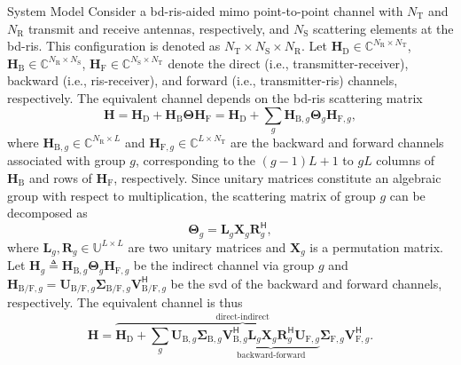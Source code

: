\documentclass[journal]{IEEEtran}
\begin{document}
\begin{section}{System Model}
		Consider a \gls{bd}-\gls{ris}-aided \gls{mimo} point-to-point channel with $N_\mathrm{T}$ and $N_\mathrm{R}$ transmit and receive antennas, respectively, and $N_\mathrm{S}$ scattering elements at the \gls{bd}-\gls{ris}.
		This configuration is denoted as $N_\mathrm{T} \times N_\mathrm{S} \times N_\mathrm{R}$.
		Let $\mathbf{H}_\mathrm{D} \in \mathbb{C}^{N_\mathrm{R} \times N_\mathrm{T}}$, $\mathbf{H}_\mathrm{B} \in \mathbb{C}^{N_\mathrm{R} \times N_\mathrm{S}}$, $\mathbf{H}_\mathrm{F} \in \mathbb{C}^{N_\mathrm{S} \times N_\mathrm{T}}$ denote the direct (i.e., transmitter-receiver), backward (i.e., \gls{ris}-receiver), and forward (i.e., transmitter-\gls{ris}) channels, respectively.
		The equivalent channel depends on the \gls{bd}-\gls{ris} scattering matrix
		\begin{equation}
			\label{eq:channel}
			\mathbf{H} = \mathbf{H}_\mathrm{D} + \mathbf{H}_\mathrm{B} \mathbf{\Theta} \mathbf{H}_\mathrm{F} = \mathbf{H}_\mathrm{D} + \sum_g \mathbf{H}_{\mathrm{B},g} \mathbf{\Theta}_g \mathbf{H}_{\mathrm{F},g},
		\end{equation}
		where $\mathbf{H}_{\mathrm{B},g} \in \mathbb{C}^{N_\mathrm{R} \times L}$ and $\mathbf{H}_{\mathrm{F},g} \in \mathbb{C}^{L \times N_\mathrm{T}}$ are the backward and forward channels associated with group $g$, corresponding to the $(g{-}1)L{+}1$ to $gL$ columns of $\mathbf{H}_\mathrm{B}$ and rows of $\mathbf{H}_\mathrm{F}$, respectively.
		Since unitary matrices constitute an algebraic group with respect to multiplication, the scattering matrix of group $g$ can be decomposed as
		\begin{equation}
			\label{eq:ris_decompose_group}
			\mathbf{\Theta}_g = \mathbf{L}_g \mathbf{X}_g \mathbf{R}_g^\mathsf{H},
		\end{equation}
		where $\mathbf{L}_g, \mathbf{R}_g \in \mathbb{U}^{L \times L}$ are two unitary matrices and $\mathbf{X}_g$ is a permutation matrix.
		Let $\mathbf{H}_g \triangleq \mathbf{H}_{\mathrm{B},g} \mathbf{\Theta}_g \mathbf{H}_{\mathrm{F},g}$ be the indirect channel via group $g$ and $\mathbf{H}_{\mathrm{B/F},g} = \mathbf{U}_{\mathrm{B/F},g} \mathbf{\Sigma}_{\mathrm{B/F},g} \mathbf{V}_{\mathrm{B/F},g}^\mathsf{H}$ be the \gls{svd} of the backward and forward channels, respectively.
		The equivalent channel is thus
		\begin{equation}
			\label{eq:channel_svd}
			\mathbf{H} = \overbrace{\mathbf{H}_\mathrm{D} + \sum_g \mathbf{U}_{\mathrm{B},g} \mathbf{\Sigma}_{\mathrm{B},g} \underbrace{\mathbf{V}_{\mathrm{B},g}^\mathsf{H} \mathbf{L}_g \mathbf{X}_g \mathbf{R}_g^\mathsf{H} \mathbf{U}_{\mathrm{F},g}}_\text{backward-forward} \mathbf{\Sigma}_{\mathrm{F},g} \mathbf{V}_{\mathrm{F},g}^\mathsf{H}}^\text{direct-indirect}.
		\end{equation}


\end{section}
\end{document}
